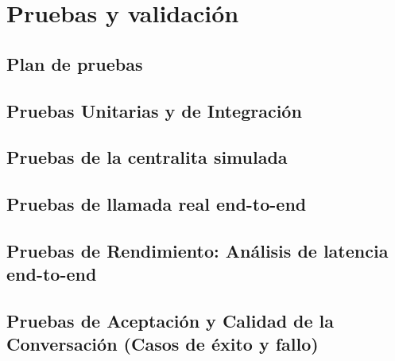 \chapter{\textbf{Pruebas y validación}}
\label{ch:Pruebas}
\thispagestyle{fancy}

\section{Plan de pruebas}
\label{sec:plan_pruebas}

\textoBase

\section{Pruebas Unitarias y de Integración}
\label{sec:pruebas_unitarias_integracion}

\textoBaseAlt

\section{Pruebas de la centralita simulada}
\label{sec:pruebas_centralita}

\textoBase

\section{Pruebas de llamada real end-to-end}
\label{sec:pruebas_llamada_real}

\textoBaseAlt

\section{Pruebas de Rendimiento: Análisis de latencia end-to-end}
\label{sec:pruebas_rendimiento}

\textoBase


\section{Pruebas de Aceptación y Calidad de la Conversación (Casos de éxito y fallo)}
\label{sec:pruebas_aceptacion}

\textoBaseAlt
